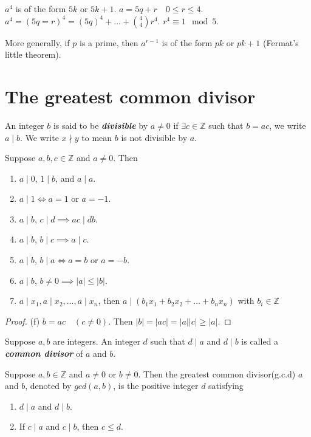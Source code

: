 \documentclass{article}
\begin{document}
\begin{multicols}{2}
\begin{example}
$a^4$ is of the form $5k$ or $5k+1$.
$a = 5q+r \quad 0\leq r \leq 4$. $a^4=(5q=r)^4=(5q)^4+\dots+{4\choose4} r^4$. $r^4 \equiv 1 \mod 5$.
\end{example}

\begin{example}
More generally, if $p$ is a prime, then $a^{r-1}$ is of the form $pk$ or $pk+1$ (Fermat's little theorem).
\end{example}

\section{The greatest common divisor}
\begin{mydefinition}
An integer $b$ is said to be \textbf{\emph{divisible}} by $a\neq 0$ if $\exists c\in \mathbb{Z}$ such that $b=ac$, we write $a\mid b$. We write $x\nmid y$ to mean $b$ is not divisible by $a$.
\end{mydefinition}

\begin{mytheorem}
Suppose $a,b,c\in \mathbb{Z}$ and $a\neq 0$. Then
\begin{enumerate}[label={(\alph*)}]
\item $a\mid 0$, $1\mid b$, and $a\mid a$.
\item $a\mid 1 \iff a=1$ or $a=-1$.
\item $a\mid b$, $c\mid d \implies ac\mid db$.
\item $a\mid b$, $b\mid c \implies a\mid c$.
\item $a\mid b$, $b\mid a \iff a=b$ or $a=-b$.
\item $a\mid b$, $b\neq 0 \implies |a|\leq |b|$.
\item $a\mid x_1, a\mid x_2,\dots, a\mid x_n$, then $a\mid (b_1x_1+b_2x_2+\dots+b_nx_n)$ with $b_i\in \mathbb{Z}$
\end{enumerate}
\end{mytheorem}
\begin{proof}
(f) $b=ac\quad (c\neq 0)$. Then $|b|=|ac|=|a||c|\geq |a|$. 
\end{proof}

\begin{mydefinition}
Suppose $a,b$ are integers.
An integer $d$ such that $d\mid a$ and $d\mid b$ is called a \textbf{\emph{common divisor}} of $a$ and $b$.
\end{mydefinition}

\begin{mydefinition}
Suppose $a,b\in \mathbb{Z}$ and $a\neq 0$ or $b\neq 0$.
Then the greatest common divisor(g.c.d) $a$ and $b$, denoted by $gcd(a,b)$, is the positive integer $d$ satisfying
\begin{enumerate}[label={(\alph*)}]
\item $d\mid a$ and $d\mid b$.
\item If $c\mid a$ and $c\mid b$, then $c\leq d$.
\end{enumerate}
\end{mydefinition}


\end{multicols}
\end{document}

